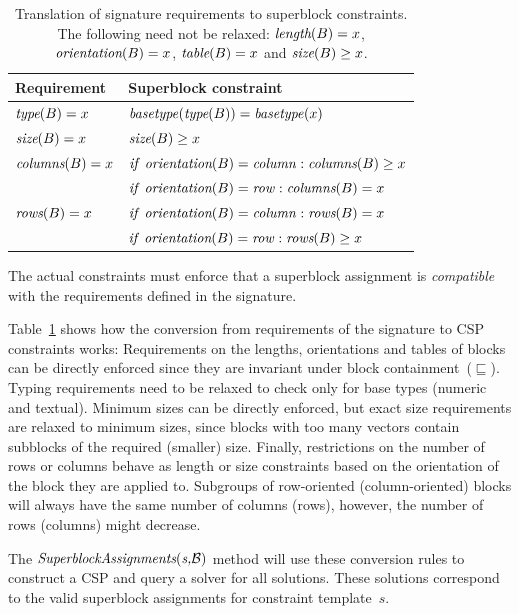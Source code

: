 \begin{table}[tbh]
  \caption{Translation of signature requirements to superblock constraints. The following need not be relaxed: $\textit{length}(B) = x$, $\textit{orientation}(B) = x$, $\textit{table}(B) = x$ and $\textit{size}(B) \geq x$.}
  \label{tbl:translation}
  \begin{tabularx}{\linewidth}{lX}
    \textbf{Requirement} & \textbf{Superblock constraint} \\ \hline \hline
    $\textit{type}(B) = x$ & $\mathit{basetype}(\textit{type}(B)) = \mathit{basetype}(x)$ \\ \hline
    $\textit{size}(B) = x$ & $\textit{size}(B) \geq x$ \\ \hline
    $\textit{columns}(B) = x$ & $\mathit{if}~\textit{orientation}(B) = \mathit{column}: \textit{columns}(B) \geq x$ \\ 
    & $\mathit{if}~\textit{orientation}(B) = \mathit{row}: \textit{columns}(B) = x$ \\ \hline
    $\textit{rows}(B) = x$ & $\mathit{if}~\textit{orientation}(B) = \mathit{column}: \textit{rows}(B) = x$ \\ 
    & $\mathit{if}~\textit{orientation}(B) = \mathit{row}: \textit{rows}(B) \geq x$
  \end{tabularx}
\end{table}

The actual constraints must enforce that a superblock assignment is \textit{compatible} with the requirements defined in the signature.

Table~\ref{tbl:translation} shows how the conversion from requirements of the signature to CSP constraints works:
Requirements on the lengths, orientations and tables of blocks can be directly enforced since they are invariant under block containment~($\sqsubseteq$).
Typing requirements need to be relaxed to check only for base types (numeric and textual).
Minimum sizes can be directly enforced, but exact size requirements are relaxed to minimum sizes, since blocks with too many vectors contain subblocks of the required (smaller) size.
Finally, restrictions on the number of rows or columns behave as length or size constraints based on the orientation of the block they are applied to.
Subgroups of row-oriented (column-oriented) blocks will always have the same number of columns (rows), however, the number of rows (columns) might decrease.

The $\textit{SuperblockAssignments}(\textit{s,\ensuremath{\mathcal{B}}})$ method will use these conversion rules to construct a CSP and query a solver for all solutions.
These solutions correspond to the valid superblock assignments for constraint template~$s$.

